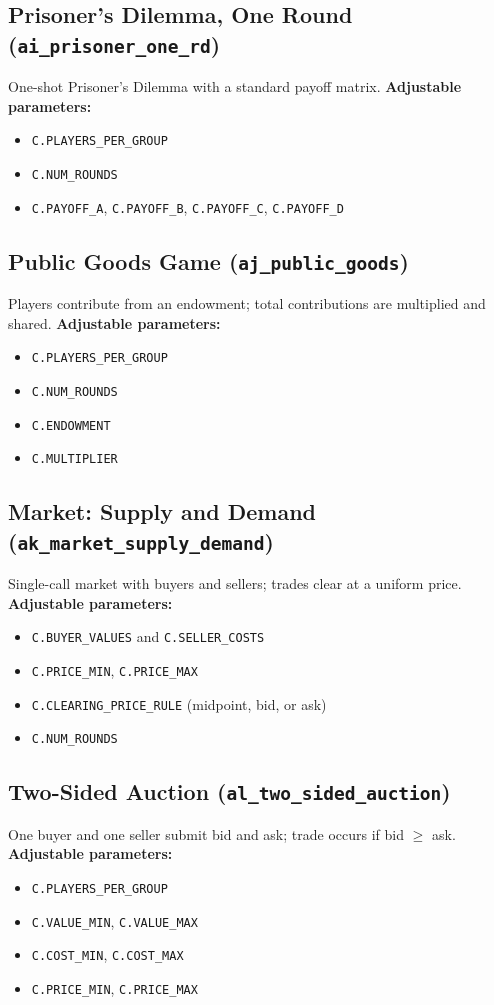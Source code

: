 \documentclass[11pt]{article}
\begin{document}
\subsection*{Prisoner's Dilemma, One Round (\texttt{ai\_prisoner\_one\_rd})}
One-shot Prisoner's Dilemma with a standard payoff matrix.
\textbf{Adjustable parameters:}
\begin{itemize}
\item \texttt{C.PLAYERS\_PER\_GROUP}
\item \texttt{C.NUM\_ROUNDS}
\item \texttt{C.PAYOFF\_A}, \texttt{C.PAYOFF\_B}, \texttt{C.PAYOFF\_C}, \texttt{C.PAYOFF\_D}
\end{itemize}

\subsection*{Public Goods Game (\texttt{aj\_public\_goods})}
Players contribute from an endowment; total contributions are multiplied and shared.
\textbf{Adjustable parameters:}
\begin{itemize}
\item \texttt{C.PLAYERS\_PER\_GROUP}
\item \texttt{C.NUM\_ROUNDS}
\item \texttt{C.ENDOWMENT}
\item \texttt{C.MULTIPLIER}
\end{itemize}

\subsection*{Market: Supply and Demand (\texttt{ak\_market\_supply\_demand})}
Single-call market with buyers and sellers; trades clear at a uniform price.
\textbf{Adjustable parameters:}
\begin{itemize}
\item \texttt{C.BUYER\_VALUES} and \texttt{C.SELLER\_COSTS}
\item \texttt{C.PRICE\_MIN}, \texttt{C.PRICE\_MAX}
\item \texttt{C.CLEARING\_PRICE\_RULE} (midpoint, bid, or ask)
\item \texttt{C.NUM\_ROUNDS}
\end{itemize}

\subsection*{Two-Sided Auction (\texttt{al\_two\_sided\_auction})}
One buyer and one seller submit bid and ask; trade occurs if bid \(\ge\) ask.
\textbf{Adjustable parameters:}
\begin{itemize}
\item \texttt{C.PLAYERS\_PER\_GROUP}
\item \texttt{C.VALUE\_MIN}, \texttt{C.VALUE\_MAX}
\item \texttt{C.COST\_MIN}, \texttt{C.COST\_MAX}
\item \texttt{C.PRICE\_MIN}, \texttt{C.PRICE\_MAX}
\end{itemize}
\end{document}
